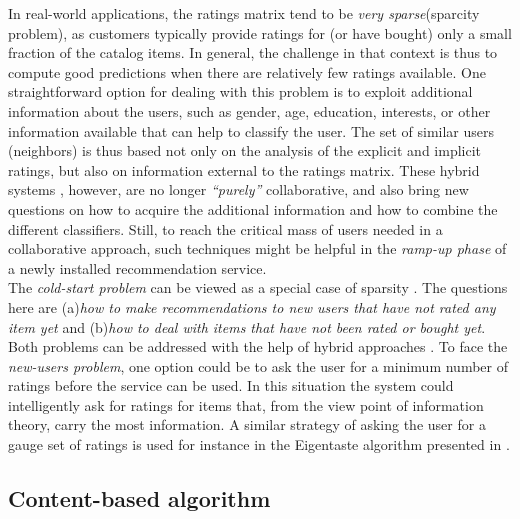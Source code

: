 In real-world applications, the ratings matrix tend to be \textit{very
sparse}(sparcity problem), as customers typically provide  ratings
for (or have bought) only a small fraction of the catalog items. In
general, the challenge in that context is thus to compute good
predictions when there are relatively few ratings available. One
straightforward option for dealing with this problem is to exploit
additional information about the users, such as gender, age,
education, interests, or other information available that can help to
classify the user. The set of similar users (neighbors) is thus based
not only on the analysis of the explicit and implicit ratings, but
also on information external to the ratings matrix. These hybrid
systems \cite{pazzani2007content}, however, are no longer
\textit{“purely”} collaborative, and also bring new questions on how to acquire
the additional information and how to combine the different
classifiers. Still, to reach the critical mass of users needed
in a collaborative approach, such techniques might be helpful in the
\textit{ramp-up phase} of a newly installed recommendation service. \\
The \textit{cold-start problem} can be viewed as a special case of
sparsity \cite{huang2004applying}. The questions here are (a)\textit{how 
to make recommendations to new users that have not rated
any item yet} and (b)\textit{how to deal with items that have not
been rated or bought yet}. Both problems can be addressed with the
help of hybrid approaches \cite{adomavicius2005toward}.  To face the
\textit{new-users problem}, one option could be to ask the user for a
minimum number of ratings before the service can be used. In this
situation the system could intelligently ask for ratings for items
that, from the view point of information theory, carry the most
information\cite{rashid2002getting}. A similar strategy of asking
the user for a gauge set of ratings is used for instance in the Eigentaste
algorithm presented in \cite{goldberg2001eigentaste}.

\subsection{Content-based algorithm}

